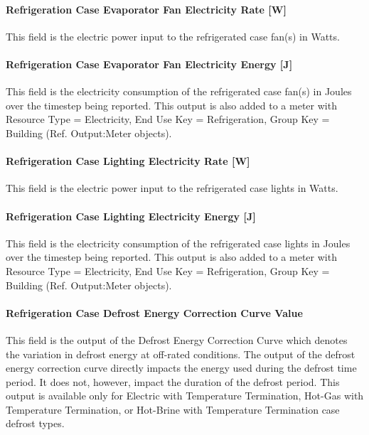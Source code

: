 \paragraph{Refrigeration Case Evaporator Fan Electricity Rate {[}W{]}}\label{refrigeration-case-evaporator-fan-electric-power-w}

This field is the electric power input to the refrigerated case fan(s) in Watts.

\paragraph{Refrigeration Case Evaporator Fan Electricity Energy {[}J{]}}\label{refrigeration-case-evaporator-fan-electric-energy-j}

This field is the electricity consumption of the refrigerated case fan(s) in Joules over the timestep being reported. This output is also added to a meter with Resource Type = Electricity, End Use Key = Refrigeration, Group Key = Building (Ref. Output:Meter objects).

\paragraph{Refrigeration Case Lighting Electricity Rate {[}W{]}}\label{refrigeration-case-lighting-electric-power-w}

This field is the electric power input to the refrigerated case lights in Watts.

\paragraph{Refrigeration Case Lighting Electricity Energy {[}J{]}}\label{refrigeration-case-lighting-electric-energy-j}

This field is the electricity consumption of the refrigerated case lights in Joules over the timestep being reported. This output is also added to a meter with Resource Type = Electricity, End Use Key = Refrigeration, Group Key = Building (Ref. Output:Meter objects).

\paragraph{Refrigeration Case Defrost Energy Correction Curve Value}\label{refrigeration-case-defrost-energy-correction-curve-value}

This field is the output of the Defrost Energy Correction Curve which denotes the variation in defrost energy at off-rated conditions. The output of the defrost energy correction curve directly impacts the energy used during the defrost time period. It does not, however, impact the duration of the defrost period. This output is available only for Electric with Temperature Termination, Hot-Gas with Temperature Termination, or Hot-Brine with Temperature Termination case defrost types.

